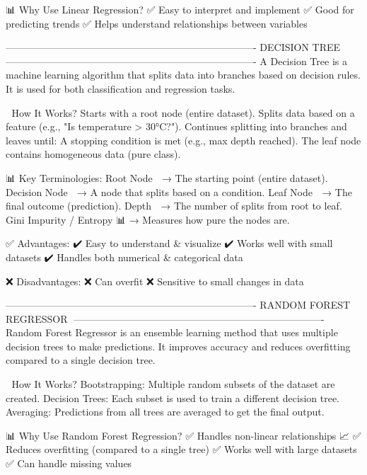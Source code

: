 📊 Why Use Linear Regression?
✅ Easy to interpret and implement
✅ Good for predicting trends
✅ Helps understand relationships between variables

----------------------------------------------------------------------------
DECISION TREE🌳
----------------------------------------------------------------------------
A Decision Tree is a machine learning algorithm that splits data into branches based on decision rules. It is used for both classification and regression tasks.

🔢 How It Works?
Starts with a root node (entire dataset).
Splits data based on a feature (e.g., "Is temperature > 30°C?").
Continues splitting into branches and leaves until:
A stopping condition is met (e.g., max depth reached).
The leaf node contains homogeneous data (pure class).

📊 Key Terminologies:
Root Node 🌱 → The starting point (entire dataset).
Decision Node 📍 → A node that splits based on a condition.
Leaf Node 🍃 → The final outcome (prediction).
Depth 📏 → The number of splits from root to leaf.
Gini Impurity / Entropy 📊 → Measures how pure the nodes are.

✅ Advantages:
✔️ Easy to understand & visualize
✔️ Works well with small datasets
✔️ Handles both numerical & categorical data

❌ Disadvantages:
❌ Can overfit 
❌ Sensitive to small changes in data

----------------------------------------------------------------------------
RANDOM FOREST REGRESSOR🌲
----------------------------------------------------------------------------
Random Forest Regressor is an ensemble learning method that uses multiple decision trees to make predictions. It improves accuracy and reduces overfitting compared to a single decision tree.

🔢 How It Works?
Bootstrapping: Multiple random subsets of the dataset are created.
Decision Trees: Each subset is used to train a different decision tree.
Averaging: Predictions from all trees are averaged to get the final output.

📊 Why Use Random Forest Regression?
✅ Handles non-linear relationships 📈
✅ Reduces overfitting (compared to a single tree)
✅ Works well with large datasets
✅ Can handle missing values
